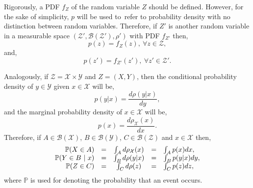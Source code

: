 Rigorously, a PDF $f_Z$ of the random variable $Z$ should be defined. However, for the sake of simplicity, $p$ will be used to refer to probability density with no distinction between random variables. Therefore, if $Z'$ is another random variable in a measurable space $(\mathcal{Z}',\mathcal{B}(\mathcal{Z}'),\rho')$ with PDF $f_{Z'}$ then,
\begin{equation*}
    p(z)  = f_Z(z), \ \forall z \in \mathcal{Z},
\end{equation*}
and,
\begin{equation*}
    p(z') = f_{Z'}(z'), \ \forall z' \in \mathcal{Z}'.
\end{equation*}

Analogously, if $\mathcal{Z} = \mathcal{X} \times \mathcal{Y}$ and $Z = (X,Y)$, then the conditional probability density of $y \in \mathcal{Y}$ given $x \in \mathcal{X}$ will be,
\begin{equation*}
  p(y|x) = \frac{d\rho(y|x)}{dy},
\end{equation*}
and the marginal probability density of $x \in \mathcal{X}$ will be,
\begin{equation*}
  p(x) = \frac{d\rho_{\mathcal{X}}(x)}{dx}.
\end{equation*}
Therefore, if $A \in \mathcal{B}(\mathcal{X})$, $B \in \mathcal{B}(\mathcal{Y})$, $C \in \mathcal{B}(\mathcal{Z})$ and $x \in \mathcal{X}$ then,
\begin{equation*}
  \begin{array}{r c c c l}
    \mathbb{P}(X \in A)         &= &\int_{A} d\rho_{\mathcal{X}}(x) &= &\int_{A} p(x)dx, \\
    \mathbb{P}(Y \in B \ | \ x) &= &\int_{B} d\rho(y|x)             &= &\int_{B} p(y|x)dy, \\
    \mathbb{P}(Z \in C)         &= &\int_{C} d\rho(z)               &= &\int_{C} p(z)dz,
  \end{array}
\end{equation*}
where $\mathbb{P}$ is used for denoting the probability that an event occurs.

